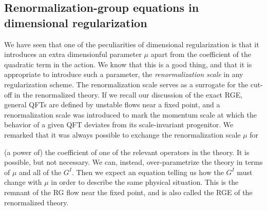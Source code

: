 \subsection{Renormalization-group equations in dimensional regularization}

We have seen that one of the peculiarities of dimensional regularization is that
it introduces an extra dimensionful parameter $\mu$ apart from the coefficient of
the quadratic term in the action. We know that this is a good thing, and that it
is appropriate to introduce such a parameter, the \emph{renormalization scale} in
any regularization scheme. The renormalization scale serves as a surrogate for
the cut-off in the renormalized theory. If we recall our discussion of the exact
RGE, general QFTs are defined by unstable flows near a fixed point, and a
renormalization scale was introduced to mark the momentum scale at which the
behavior of a given QFT deviates from its scale-invariant progenitor. We remarked
that it was always possible to exchange the renormalization scale $\mu$ for

(a power of) the coefficient of one of the relevant operators in the theory. It is
possible, but not necessary. We can, instead, over-parametrize the theory in
terms of $\mu$ and all of the $G^I$. Then we expect an equation telling us how
the $G^I$ must change with $\mu$ in order to describe the same physical situation.
This is the remnant of the RG flow near the fixed point, and is also called the
RGE of the renormalized theory.

